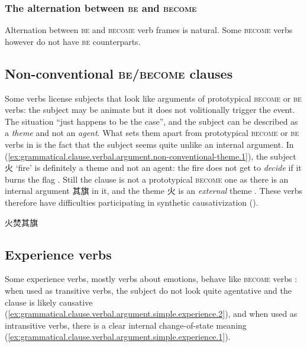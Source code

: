 \documentclass[UTF8, a4paper, oneside, scheme=plain, 12pt]{ctexrep}
\newcommand*{\citepage}[1]{p.~{#1}}
\newcommand*{\term}[1]{\emph{#1}}
\newcommand{\translate}[1]{`#1'}
\newcommand*{\category}[1]{\textsc{#1}}
\begin{document}
\subsubsection{The alternation between \category{be} and \category{become}}

Alternation between \category{be} and \category{become} verb frames is natural.
Some \category{become} verbs however do not have \category{be} counterparts.

\subsection{Non-conventional \category{be}/\category{become} clauses}
\label{sec:grammatical.clause.verbal.argument.simple.non-conventional-state}

Some verbs license subjects that look like arguments of prototypical \category{become} or \category{be} verbs:
the subject may be animate but it does not volitionally trigger the event.
The situation ``just happens to be the case'', and the subject can be described as a \term{theme} and not an \term{agent}.
What sets them apart from prototypical \category{become} or \category{be} verbs 
in 
is the fact that the subject seems quite unlike an internal argument.
In (\ref{ex:grammatical.clause.verbal.argument.non-conventional-theme.1}),
the subject 火 \translate{fire} is definitely a theme and not an agent:
the fire does not get to \emph{decide} if it burns the flag
\citep[\citepage{276}]{meiguang2018}.
Still the clause is not a prototypical \category{become} one
as there is an internal argument 其旗 in it,
and the theme 火 is an \emph{external} theme
\citep[\citepage{353}]{meiguang2018}.
These verbs therefore have difficulties participating in synthetic causativization
().

\begin{exe}
    \ex\label{ex:grammatical.clause.verbal.argument.non-conventional-theme.1} 火焚其旗
\end{exe}

\subsection{Experience verbs}
\label{sec:grammatical.clause.verbal.argument.simple.experience}
Some experience verbs, mostly verbs about emotions, behave like \category{become} verbs
\citep[\citepage{273}]{meiguang2018}:
when used as transitive verbs,
the subject do not look quite agentative and the clause is likely causative
(\ref{ex:grammatical.clause.verbal.argument.simple.experience.2}),
and when used as intransitive verbs,
there is a clear internal change-of-state meaning
(\ref{ex:grammatical.clause.verbal.argument.simple.experience.1}).
\end{document}
